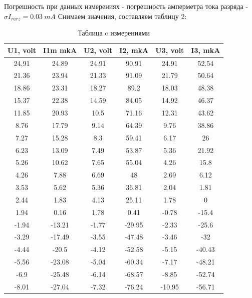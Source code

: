 \documentclass[a4paper, 14pt]{extarticle}%
\begin{document}
Погрешность при данных измерениях - погрешность амперметра тока разряда - $\sigma{I_{rarz}} = 0.03 \: mA$
Снимаем значения, составляем таблицу 2:


\begin{table}[!]
\caption{Таблица c измерениями}
    \begin{center}
        \begin{tabular}{| c | c | c | c | c | c |}
        \hline
        \textbf{U1, volt} & \textbf{I1m mkA} & \textbf{U2, volt} & \textbf{I2, mkA} & \textbf{U3, volt} & \textbf{I3, mkA} \\
        \hline
        24,91 & 24.89 &   24.91   & 90.91 & 24.91 & 52.54\\
        \hline
        21.36 & 23.94 & 21.33 & 91.09 & 21.79 & 50.64\\
        \hline
        18.86 & 23.31 & 18.27 & 89.2 & 18.03 & 48.38\\
        \hline
        15.37 & 22.38 & 14.59 & 84.05 & 14.92 & 46.37\\
        \hline
        11.85 & 20.93 & 10.5 & 71.16 & 12.31 & 43.62\\
        \hline
        8.76 & 17.79 & 9.14 & 64.39 & 9.76 & 38.86\\
        \hline
        7.27 & 15.28 & 8.3 & 59.41 & 6.17 & 26\\
        \hline
        6.23 & 13.09 & 7.49 & 53.87 & 5.36 & 21.92\\
        \hline
        5.26 & 10.62 & 7.65 & 55.04 & 4.26 & 15.8\\
        \hline
        4.26 & 7.88 & 6.69 & 48 & 2.69 & 6.12\\
        \hline
        3.53 & 5.62 & 5.36 & 36.81 & 2.04 & 1.81\\
        \hline
        2.44 & 1.83 & 4.13 & 25.11 & 1.78 & 0\\
        \hline
        1.94 & 0.16 & 1.78 & 0.41 & -0.78 & -15.4\\
        \hline
        -1.94 & -13.21 & -1.77 & -29.95 & -2.33 & -25.6\\
        \hline
        -3.29 & -17.49 & -3.55 & -47.48 & -3.46 & -32\\
        \hline
        -4.44 & -20.5 & -4.12 & -52.58 & -5.15 & -40.43\\
        \hline
        -5.56 & -23.08 & -5.04 & -60.34 & -7.17 & -48.21\\
        \hline
        -6.9 & -25.48 & -6.14 & -68.57 & -8.85 & -52.74\\
        \hline
        -8.01 & -27.04 & -7.32 & -76.24 & -10.95 & -56.71\\

\end{tabular}
\end{center}
\end{table}
\end{document}
